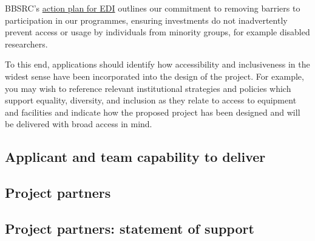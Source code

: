 \documentclass[12pt]{article}
\newenvironment{instruction}{\par\color{red}}{\par}
\begin{document}
\begin{instruction}
\begin{itemize}
\end{itemize}

BBSRC’s
\href{https://www.ukri.org/publications/bbsrc-equality-diversity-and-inclusion-action-plan/bbsrc-action-plan-for-equality-diversity-and-inclusion-in-the-biosciences-2022-to-2025/}{action
plan for EDI} outlines our commitment to removing barriers to participation in
our programmes, ensuring investments do not inadvertently prevent access or
usage by individuals from minority groups, for example disabled researchers.

To this end, applications should identify how accessibility and inclusiveness
in the widest sense have been incorporated into the design of the project. For
example, you may wish to reference relevant institutional strategies and
policies which support equality, diversity, and inclusion as they relate to
access to equipment and facilities and indicate how the proposed project has
been designed and will be delivered with broad access in mind.

\end{instruction}

\begin{bibunit}

\putbib
\end{bibunit}

\pagebreak
\subsection{Applicant and team capability to deliver}



\pagebreak
\subsection{Project partners}



\pagebreak
\subsection{Project partners: statement of support}


\end{document}
